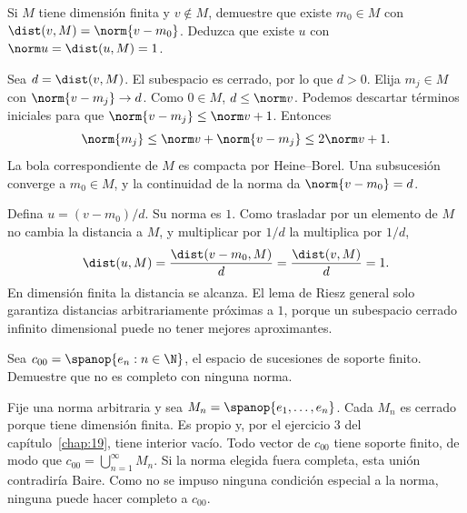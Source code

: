 \begin{ejercicio}
Si $M$ tiene dimensión finita y $v\notin M$, demuestre que existe $m_0\in M$ con $\dist(v,M)=\norm{v-m_0}$. Deduzca que existe $u$ con $\norm u=\dist(u,M)=1$.
\end{ejercicio}
\begin{solucion}
Sea $d=\dist(v,M)$. El subespacio es cerrado, por lo que $d>0$. Elija $m_j\in M$ con $\norm{v-m_j}\to d$. Como $0\in M$, $d\leq\norm v$. Podemos descartar términos iniciales para que $\norm{v-m_j}\leq\norm v+1$. Entonces
\[
 \norm{m_j}\leq\norm v+\norm{v-m_j}\leq2\norm v+1.
\]
La bola correspondiente de $M$ es compacta por Heine--Borel. Una subsucesión converge a $m_0\in M$, y la continuidad de la norma da $\norm{v-m_0}=d$.

Defina $u=(v-m_0)/d$. Su norma es $1$. Como trasladar por un elemento de $M$ no cambia la distancia a $M$, y multiplicar por $1/d$ la multiplica por $1/d$,
\[
 \dist(u,M)=\frac{\dist(v-m_0,M)}d=\frac{\dist(v,M)}d=1.
\]
En dimensión finita la distancia se alcanza. El lema de Riesz general solo garantiza distancias arbitrariamente próximas a $1$, porque un subespacio cerrado infinito dimensional puede no tener mejores aproximantes.
\end{solucion}

\begin{ejercicio}
Sea $c_{00}=\spanop\{e_n:n\in\N\}$, el espacio de sucesiones de soporte finito. Demuestre que no es completo con ninguna norma.
\end{ejercicio}
\begin{solucion}
Fije una norma arbitraria y sea $M_n=\spanop\{e_1,\ldots,e_n\}$. Cada $M_n$ es cerrado porque tiene dimensión finita. Es propio y, por el ejercicio 3 del capítulo~\ref{chap:19}, tiene interior vacío. Todo vector de $c_{00}$ tiene soporte finito, de modo que $c_{00}=\bigcup_{n=1}^{\infty}M_n$. Si la norma elegida fuera completa, esta unión contradiría Baire. Como no se impuso ninguna condición especial a la norma, ninguna puede hacer completo a $c_{00}$.
\end{solucion}

